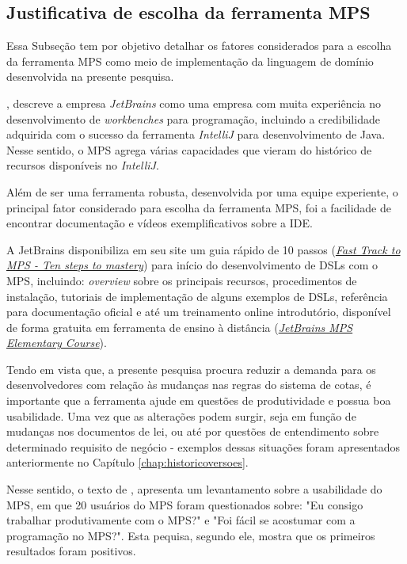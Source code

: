 
\subsection{Justificativa de escolha da ferramenta MPS}
\label{justificativamps}

Essa Subseção tem por objetivo detalhar os fatores considerados para a escolha da ferramenta \gls{MPS} como meio de implementação da linguagem de domínio desenvolvida na presente pesquisa.

, descreve a empresa \textit{JetBrains} como uma empresa com muita experiência no desenvolvimento de \textit{workbenches} para programação, incluindo a credibilidade adquirida com o sucesso da ferramenta \textit{IntelliJ} para desenvolvimento de Java.  Nesse sentido, o \gls{MPS} agrega várias capacidades que vieram do histórico de recursos disponíveis no \textit{IntelliJ}. 

Além de ser uma ferramenta robusta, desenvolvida por uma equipe experiente, o principal fator considerado para escolha da ferramenta \gls{MPS}, foi a facilidade de encontrar documentação e vídeos exemplificativos sobre a \gls{IDE}. 

A JetBrains disponibiliza em seu site um guia rápido de 10 passos (\href{www.jetbrains.com/help/mps/fast-track-to-mps.html}{\textit{Fast Track to MPS - Ten steps to mastery}}) para início do desenvolvimento de \gls{DSL}s com o \gls{MPS}, incluindo: \textit{overview} sobre os principais recursos, procedimentos de instalação, tutoriais de implementação de alguns exemplos de \gls{DSL}s, referência para documentação oficial e até um treinamento online introdutório, disponível de forma gratuita em ferramenta de ensino à distância (\href{https://stepik.org/course/37360/promo}{\textit{JetBrains MPS Elementary Course}}).  


\newpage
Tendo em vista que, a presente pesquisa procura reduzir a demanda para os desenvolvedores com relação às mudanças nas regras do sistema de cotas, é importante que a ferramenta ajude em questões de produtividade e possua boa usabilidade. Uma vez que as alterações podem surgir, seja em função de mudanças nos documentos de lei, ou até por questões de entendimento sobre determinado requisito de negócio - exemplos dessas situações foram apresentados anteriormente no Capítulo \ref{chap:historicoversoes}.

Nesse sentido, o texto de  , apresenta um levantamento sobre a usabilidade do \gls{MPS}, em que 20 usuários do \gls{MPS} foram questionados sobre: "Eu consigo trabalhar produtivamente com o MPS?" e "Foi fácil se acostumar com a programação no MPS?". Esta pequisa, segundo ele, mostra que os primeiros resultados foram positivos. 

